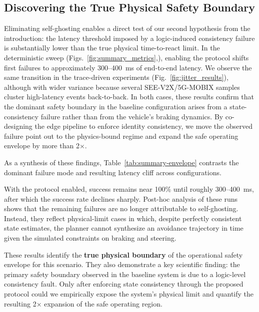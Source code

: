 \subsection{Discovering the True Physical Safety Boundary}
\label{sec:physical_boundary}

Eliminating self-ghosting enables a direct test of our second hypothesis from the introduction: the latency threshold imposed by a logic-induced consistency failure is substantially lower than the true physical time-to-react limit.
In the deterministic sweep (Figs.~\ref{fig:summary_metrics},), enabling the protocol shifts first failures to approximately 300--400~ms of end-to-end latency. We observe the same transition in the trace-driven experiments (Fig.~\ref{fig:jitter_results}), although with wider variance because several SEE-V2X/5G-MOBIX samples cluster high-latency events back-to-back. In both cases, these results confirm that the dominant safety boundary in the baseline configuration arises from a state-consistency failure rather than from the vehicle’s braking dynamics. By co-designing the edge pipeline to enforce identity consistency, we move the observed failure point out to the physics-bound regime and expand the safe operating envelope by more than 2\(\times\).

As a synthesis of these findings, Table~\ref{tab:summary-envelope} contrasts the dominant failure mode and resulting latency cliff across configurations.



With the protocol enabled, success remains near 100\% until roughly 300–400~ms, after which the success rate declines sharply. Post-hoc analysis of these runs shows that the remaining failures are no longer attributable to self-ghosting. Instead, they reflect physical-limit cases in which, despite perfectly consistent state estimates, the planner cannot synthesize an avoidance trajectory in time given the simulated constraints on braking and steering.

These results identify the \textbf{true physical boundary} of the operational safety envelope for this scenario. They also demonstrate a key scientific finding: the primary safety boundary observed in the baseline system is due to a logic-level consistency fault. Only after enforcing state consistency through the proposed protocol could we empirically expose the system’s physical limit and quantify the resulting 2× expansion of the safe operating region.


